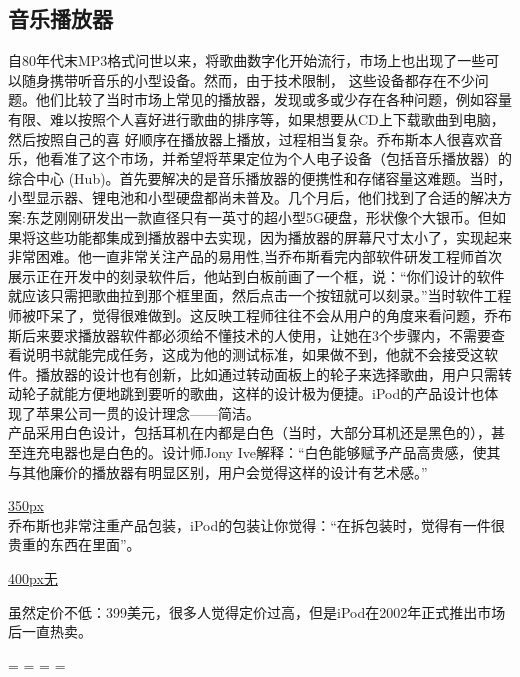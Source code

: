 \hypertarget{ux97f3ux4e50ux64adux653eux5668}{%
\subsection{音乐播放器}\label{ux97f3ux4e50ux64adux653eux5668}}

自80年代末MP3格式问世以来，将歌曲数字化开始流行，市场上也出现了一些可以随身携带听音乐的小型设备。然而，由于技术限制，
这些设备都存在不少问题。他们比较了当时市场上常见的播放器，发现或多或少存在各种问题，例如容量有限、难以按照个人喜好进行歌曲的排序等，如果想要从CD上下载歌曲到电脑，然后按照自己的喜
好顺序在播放器上播放，过程相当复杂。乔布斯本人很喜欢音乐，他看准了这个市场，并希望将苹果定位为个人电子设备（包括音乐播放器）的综合中心
(Hub)。首先要解决的是音乐播放器的便携性和存储容量这难题。当时，小型显示器、锂电池和小型硬盘都尚未普及。几个月后，他们找到了合适的解决方案:东芝刚刚研发出一款直径只有一英寸的超小型5G硬盘，形状像个大银币。但如果将这些功能都集成到播放器中去实现，因为播放器的屏幕尺寸太小了，实现起来非常困难。他一直非常关注产品的易用性,当乔布斯看完内部软件研发工程师首次展示正在开发中的刻录软件后，他站到白板前画了一个框，说：``你们设计的软件就应该只需把歌曲拉到那个框里面，然后点击一个按钮就可以刻录。''当时软件工程师被吓呆了，觉得很难做到。这反映工程师往往不会从用户的角度来看问题，乔布斯后来要求播放器软件都必须给不懂技术的人使用，让她在3个步骤内，不需要查看说明书就能完成任务，这成为他的测试标准，如果做不到，他就不会接受这软件。播放器的设计也有创新，比如通过转动面板上的轮子来选择歌曲，用户只需转动轮子就能方便地跳到要听的歌曲，这样的设计极为便捷。iPod的产品设计也体现了苹果公司一贯的设计理念------简洁。\\
产品采用白色设计，包括耳机在内都是白色（当时，大部分耳机还是黑色的），甚至连充电器也是白色的。设计师Jony
Ive解释：``白色能够赋予产品高贵感，使其与其他廉价的播放器有明显区别，用户会觉得这样的设计有艺术感。''

\href{文件:!ipodcutoutScreenshot_2023-12-06_201652.jpg}{350px}\\
乔布斯也非常注重产品包装，iPod的包装让你觉得：``在拆包装时，觉得有一件很贵重的东西在里面''。

\href{文件:IpodPackageScreenshot_2023-07-23_201312_labi.jpg}{400px\textbar{}无}

虽然定价不低：399美元，很多人觉得定价过高，但是iPod在2002年正式推出市场后一直热卖。

\begin{description}
\tightlist
\item[]
= = = =
\end{description}

